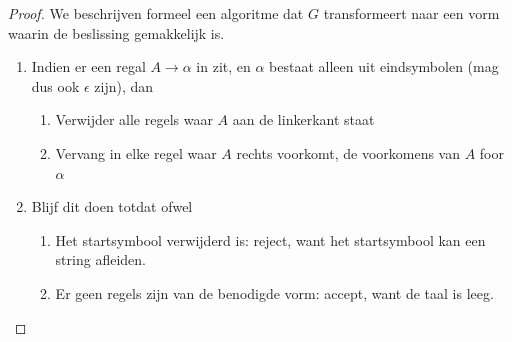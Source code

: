 \begin{proof}
	We beschrijven formeel een algoritme dat $G$ transformeert naar een vorm waarin de beslissing gemakkelijk is.
	\begin{enumerate}
		\item Indien er een regal $A \rightarrow \alpha$ in zit, en $\alpha$ bestaat alleen uit eindsymbolen (mag dus ook $\epsilon$ zijn), dan
		\begin{enumerate}
			\item Verwijder alle regels waar $A$ aan de linkerkant staat
			\item Vervang in elke regel waar $A$ rechts voorkomt, de voorkomens van $A$ foor $\alpha$
		\end{enumerate}
		\item Blijf dit doen totdat ofwel
		\begin{enumerate}
			\item Het startsymbool verwijderd is: reject, want het startsymbool kan een string afleiden.
			\item Er geen regels zijn van de benodigde vorm: accept, want de taal is leeg.
		\end{enumerate}
	\end{enumerate}
\end{proof}